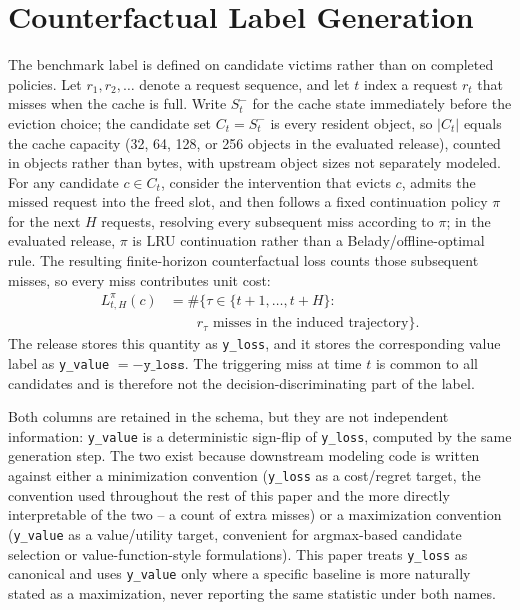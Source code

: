 \section{Counterfactual Label Generation}
\label{sec:label-generation}

The benchmark label is defined on candidate victims rather than on completed policies. Let $r_1, r_2, \ldots$ denote a request sequence, and let $t$ index a request $r_t$ that misses when the cache is full. Write $S_t^{-}$ for the cache state immediately before the eviction choice; the candidate set $C_t = S_t^{-}$ is every resident object, so $|C_t|$ equals the cache capacity (32, 64, 128, or 256 objects in the evaluated release), counted in objects rather than bytes, with upstream object sizes not separately modeled. For any candidate $c \in C_t$, consider the intervention that evicts $c$, admits the missed request into the freed slot, and then follows a fixed continuation policy $\pi$ for the next $H$ requests, resolving every subsequent miss according to $\pi$; in the evaluated release, $\pi$ is LRU continuation rather than a Belady/offline-optimal rule. The resulting finite-horizon counterfactual loss counts those subsequent misses, so every miss contributes unit cost:
\[
\begin{aligned}
L_{t,H}^{\pi}(c)
&=
\#\{\tau \in \{t+1, \ldots, t+H\} : \\
&\qquad r_{\tau} \text{ misses in the induced trajectory}\}.
\end{aligned}
\]
The release stores this quantity as \texttt{y\_loss}, and it stores the corresponding value label as \texttt{y\_value} $= -\texttt{y\_loss}$. The triggering miss at time $t$ is common to all candidates and is therefore not the decision-discriminating part of the label.

Both columns are retained in the schema, but they are not independent
information: \texttt{y\_value} is a deterministic sign-flip of
\texttt{y\_loss}, computed by the same generation step. The two exist
because downstream modeling code is written against either a
minimization convention (\texttt{y\_loss} as a cost/regret target, the
convention used throughout the rest of this paper and the more directly
interpretable of the two -- a count of extra misses) or a maximization
convention (\texttt{y\_value} as a value/utility target, convenient for
argmax-based candidate selection or value-function-style formulations).
This paper treats \texttt{y\_loss} as canonical and uses
\texttt{y\_value} only where a specific baseline is more naturally stated
as a maximization, never reporting the same statistic under both names.

